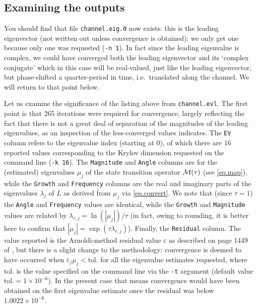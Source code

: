 \documentclass[11pt,a4paper]{report}
\newcommand{\ie}{i.e.\ }
\newcommand\Lop{{L}}
\newcommand\Mop{{\cal M}}
\begin{document}
\subsection{Examining the outputs}

You should find that file \verb+channel.eig.0+ now exists: this is the
leading eigenvector (not written out unless convergence is obtained):
we only get one because only one was requested (\verb+-n 1+).  In fact
since the leading eigenvalue is complex, we could have converged both
the leading eigenvector and its `complex conjugate' which in this case
will be real-valued, just like the leading eigenvector, but
phase-shifted a quarter-period in time, \ie translated along the
channel. We will return to that point below.

Let us examine the significance of the listing above from
\verb+channel.evl+.  The first point is that 265 iterations were
required for convergence, largely reflecting the fact that there is
not a great deal of separation of the magnitudes of the leading
eigenvalues, as an inspection of the less-converged values indicates.
The \verb+EV+ column refers to the eigenvalue index (starting at 0),
of which there are 16 reported values corresponding to the Krylov
dimension requested on the command line (\verb+-k 16+).  The
\verb+Magnitude+ and \verb+Angle+ columns are for the (estimated)
eigenvalues $\mu_j$ of the state transition operator $\Mop(\tau)$ (see
\ref{eq.map}), while the \verb+Growth+ and \verb+Frequency+ columns
are the real and imaginary parts of the eigenvalues $\lambda_j$ of
$\Lop$ as derived from $\mu_j$ via \eqref{eq.convert}.  We note that
(since $\tau=1$) the \verb+Angle+ and \verb+Frequency+ values are
identical, while the \verb+Growth+ and \verb+Magnitude+ values are
related by $\lambda_{r,j}=\ln(|\mu_j|)/\tau$ (in fact, owing to
rounding, it is better here to confirm that $|\mu_j| =
\exp(\tau\lambda_{r,j})$).  Finally, the \verb+Residual+ column.  The
value reported is the Arnoldi-method residual value $\varepsilon$ as
described on page 1449 of \citet{bbs08b}, but there is a slight change
to the methodology: convergence is deemed to have occurred when
$\varepsilon_j\mu_j<\textrm{tol.}$ for all the eigenvalue estimates
requested, where $\textrm{tol.}$ is the value specified on the command
line via the \verb+-t+ argument (default value
$\textrm{tol.}=1\times10^{-6}$). In the present case that means
convergence would have been obtained on the first eigenvalue estimate
once the residual was below $1.0022\times10^{-6}$.
\end{document}
